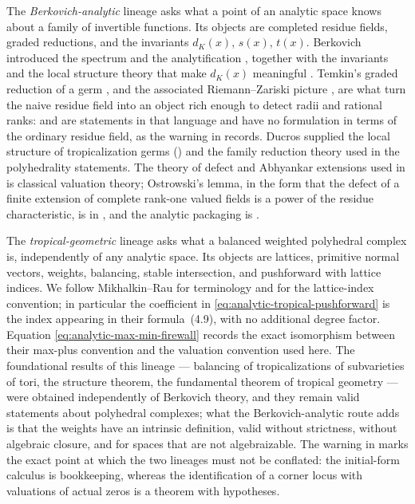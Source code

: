 The \emph{Berkovich-analytic} lineage asks what a point of an analytic space
knows about a family of invertible functions. Its objects are completed
residue fields, graded reductions, and the invariants $d_K(x)$, $s(x)$,
$t(x)$. Berkovich introduced the spectrum and the analytification
\cite{Berk12}, together with the invariants and the local structure theory
that make $d_K(x)$ meaningful \cite{Berk93}. Temkin's graded reduction of a
germ \cite{Temkin2004}, and the associated Riemann--Zariski picture
\cite{Tem11}, are what turn the naive residue field into an object rich
enough to detect radii and rational ranks: 
and  are statements in that language
and have no formulation in terms of the ordinary residue field, as the
warning in  records. Ducros supplied the
local structure of tropicalization germs () and the
family reduction theory \cite{Duc21} used in the polyhedrality statements.
The theory of defect and Abhyankar extensions used in
 is classical valuation theory; Ostrowski's
lemma, in the form that the defect of a finite extension of complete
rank-one valued fields is a power of the residue characteristic, is in
\cite[Ch.~VI]{ZariskiSamuelII}, and the analytic packaging is
\cite[\S13.8]{CLD25}.

The \emph{tropical-geometric} lineage asks what a balanced weighted
polyhedral complex is, independently of any analytic space. Its objects are
lattices, primitive normal vectors, weights, balancing, stable intersection,
and pushforward with lattice indices. We follow Mikhalkin--Rau
\cite[\S\S1.3, 2.1, 4.2, 4.6 and 6.2]{MR18Tropical} for terminology and for
the lattice-index convention; in particular the coefficient in
\eqref{eq:analytic-tropical-pushforward} is the index appearing in their
formula~(4.9), with no additional degree factor. Equation
\eqref{eq:analytic-max-min-firewall} records the exact isomorphism between
their max-plus convention and the valuation convention used here. The
foundational results of this lineage --- balancing of tropicalizations of
subvarieties of tori, the structure theorem, the fundamental theorem of
tropical geometry --- were obtained independently of Berkovich theory, and
they remain valid statements about polyhedral complexes; what the
Berkovich-analytic route adds is that the weights have an intrinsic
definition, valid without strictness, without algebraic closure, and for
spaces that are not algebraizable. The warning in
 marks the exact point at which the two
lineages must not be conflated: the initial-form calculus is bookkeeping,
whereas the identification of a corner locus with valuations of actual zeros
is a theorem with hypotheses.

